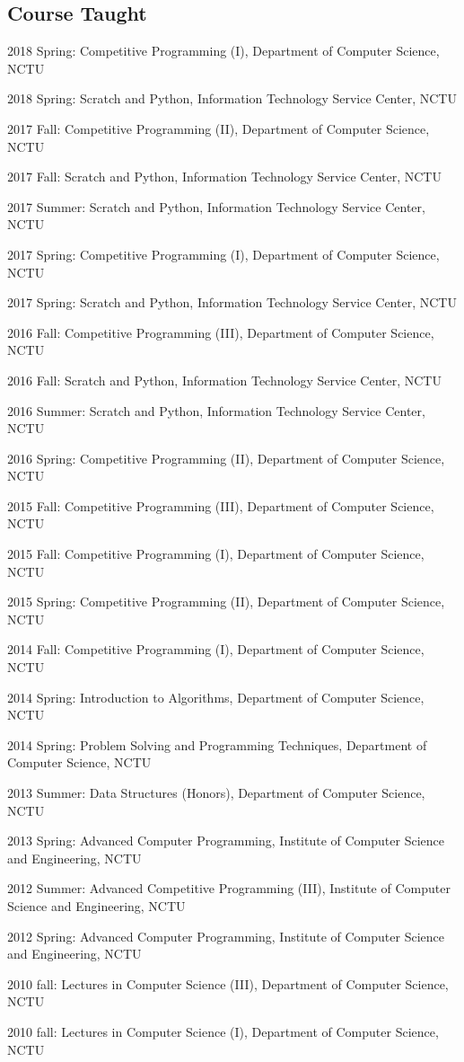 \documentclass[A4]{article}
\renewenvironment{itemize}{
  \begin{list}{}{
    \setlength{\leftmargin}{1.5em}
  }
}{
  \end{list}
}
\begin{document}
\subsection*{Course Taught}
\begin{itemize}
\item 2018 Spring: Competitive Programming (I), Department of Computer Science, NCTU
\item 2018 Spring: Scratch and Python, Information Technology Service Center, NCTU
\item 2017 Fall: Competitive Programming (II), Department of Computer Science, NCTU
\item 2017 Fall: Scratch and Python, Information Technology Service Center, NCTU
\item 2017 Summer: Scratch and Python, Information Technology Service Center, NCTU
\item 2017 Spring: Competitive Programming (I), Department of Computer Science, NCTU
\item 2017 Spring: Scratch and Python, Information Technology Service Center, NCTU
\item 2016 Fall: Competitive Programming (III), Department of Computer Science, NCTU
\item 2016 Fall: Scratch and Python, Information Technology Service Center, NCTU
\item 2016 Summer: Scratch and Python, Information Technology Service Center, NCTU
\item 2016 Spring: Competitive Programming (II), Department of Computer Science, NCTU
\item 2015 Fall: Competitive Programming (III), Department of Computer Science, NCTU
\item 2015 Fall: Competitive Programming (I), Department of Computer Science, NCTU
\item 2015 Spring: Competitive Programming (II), Department of Computer Science, NCTU
\item 2014 Fall: Competitive Programming (I), Department of Computer Science, NCTU
\item 2014 Spring: Introduction to Algorithms, Department of Computer Science, NCTU
\item 2014 Spring: Problem Solving and Programming Techniques, Department of Computer Science, NCTU
\item 2013 Summer: Data Structures (Honors), Department of Computer Science, NCTU
\item 2013 Spring: Advanced Computer Programming, Institute of Computer Science and Engineering, NCTU
\item 2012 Summer: Advanced Competitive Programming (III), Institute of Computer Science and Engineering, NCTU
\item 2012 Spring: Advanced Computer Programming, Institute of Computer Science and Engineering, NCTU
\item 2010 fall: Lectures in Computer Science (III), Department of Computer Science, NCTU
\item 2010 fall: Lectures in Computer Science (I), Department of Computer Science, NCTU
\end{itemize}
\end{document}
